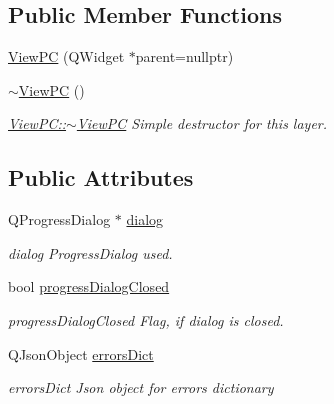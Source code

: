 \subsection*{Public Member Functions}
\begin{DoxyCompactItemize}
\item 
\hyperlink{class_view_p_c_a33c96c61f61042319c66c19059836b7f}{View\+PC} (Q\+Widget $\ast$parent=nullptr)
\item 
\hyperlink{class_view_p_c_a91c51f5c1e6ed5ab12b410339f469b0f}{$\sim$\+View\+PC} ()
\begin{DoxyCompactList}\small\item\em \hyperlink{class_view_p_c_a91c51f5c1e6ed5ab12b410339f469b0f}{View\+P\+C\+::$\sim$\+View\+PC} Simple destructor for this layer. \end{DoxyCompactList}\end{DoxyCompactItemize}
\subsection*{Public Attributes}
\begin{DoxyCompactItemize}
\item 
Q\+Progress\+Dialog $\ast$ \hyperlink{class_view_p_c_a31abbb470fe329b44e6ffee202b903ca}{dialog}
\begin{DoxyCompactList}\small\item\em dialog Progress\+Dialog used. \end{DoxyCompactList}\item 
bool \hyperlink{class_view_p_c_add8c82aa2b0b934212aa5bde9277ab36}{progress\+Dialog\+Closed}
\begin{DoxyCompactList}\small\item\em progress\+Dialog\+Closed Flag, if dialog is closed. \end{DoxyCompactList}\item 
Q\+Json\+Object \hyperlink{class_view_p_c_a26f90436aca32e5bad46f5e69a7e7e09}{errors\+Dict}
\begin{DoxyCompactList}\small\item\em errors\+Dict Json object for errors dictionary \end{DoxyCompactList}\end{DoxyCompactItemize}
